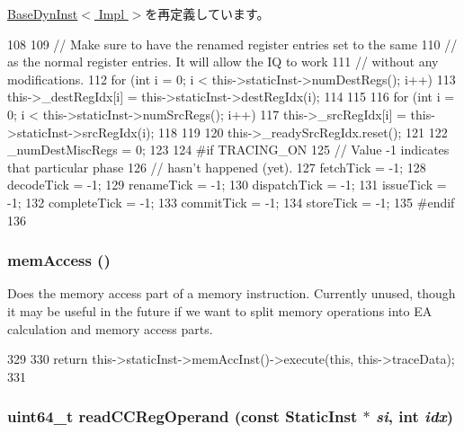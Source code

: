 \hyperlink{classBaseDynInst_a1b19937d8cca25bf52a51ae7de67ea94}{BaseDynInst$<$ Impl $>$}を再定義しています。


\begin{DoxyCode}
108 {
109     // Make sure to have the renamed register entries set to the same
110     // as the normal register entries.  It will allow the IQ to work
111     // without any modifications.
112     for (int i = 0; i < this->staticInst->numDestRegs(); i++) {
113         this->_destRegIdx[i] = this->staticInst->destRegIdx(i);
114     }
115 
116     for (int i = 0; i < this->staticInst->numSrcRegs(); i++) {
117         this->_srcRegIdx[i] = this->staticInst->srcRegIdx(i);
118     }
119 
120     this->_readySrcRegIdx.reset();
121 
122     _numDestMiscRegs = 0;
123 
124 #if TRACING_ON
125     // Value -1 indicates that particular phase
126     // hasn't happened (yet).
127     fetchTick = -1;
128     decodeTick = -1;
129     renameTick = -1;
130     dispatchTick = -1;
131     issueTick = -1;
132     completeTick = -1;
133     commitTick = -1;
134     storeTick = -1;
135 #endif
136 }
\end{DoxyCode}
\hypertarget{classBaseO3DynInst_a59a68ea55d45f5f193a5f0396b79e036}{
\subsubsection[{memAccess}]{ memAccess ()}}
\label{classBaseO3DynInst_a59a68ea55d45f5f193a5f0396b79e036}
Does the memory access part of a memory instruction. Currently unused, though it may be useful in the future if we want to split memory operations into EA calculation and memory access parts. 


\begin{DoxyCode}
329     {
330         return this->staticInst->memAccInst()->execute(this, this->traceData);
331     }
\end{DoxyCode}
\hypertarget{classBaseO3DynInst_a25532f176443f0ec538a3b833c55f4a0}{
\subsubsection[{readCCRegOperand}]{\setlength{\rightskip}{0pt plus 5cm}uint64\_\-t readCCRegOperand (const {\bf StaticInst} $\ast$ {\em si}, \/  int {\em idx})}}
\label{classBaseO3DynInst_a25532f176443f0ec538a3b833c55f4a0}




